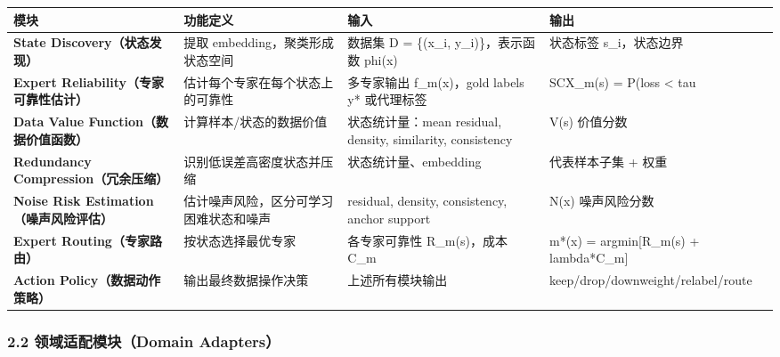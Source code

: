 \documentclass[
  12pt,
]{ctexart}
\begin{document}
\begin{longtable}[]{@{}
  >{\raggedright\arraybackslash}p{}
  >{\raggedright\arraybackslash}p{}
  >{\raggedright\arraybackslash}p{}
  >{\raggedright\arraybackslash}p{}@{}}
\toprule\noalign{}
\begin{minipage}[b]{\linewidth}\raggedright
模块
\end{minipage} & \begin{minipage}[b]{\linewidth}\raggedright
功能定义
\end{minipage} & \begin{minipage}[b]{\linewidth}\raggedright
输入
\end{minipage} & \begin{minipage}[b]{\linewidth}\raggedright
输出
\end{minipage} \\
\midrule\noalign{}
\endhead
\bottomrule\noalign{}
\endlastfoot
\textbf{State Discovery（状态发现）} & 提取 embedding，聚类形成状态空间
& 数据集 D = \{(x\_i, y\_i)\}，表示函数 phi(x) & 状态标签
s\_i，状态边界 \\
\textbf{Expert Reliability（专家可靠性估计）} &
估计每个专家在每个状态上的可靠性 & 多专家输出 f\_m(x)，gold labels y*
或代理标签 & SCX\_m(s) = P(loss \textless{} tau \\
\textbf{Data Value Function（数据价值函数）} & 计算样本/状态的数据价值 &
状态统计量：mean residual, density, similarity, consistency & V(s)
价值分数 \\
\textbf{Redundancy Compression（冗余压缩）} & 识别低误差高密度状态并压缩
& 状态统计量、embedding & 代表样本子集 + 权重 \\
\textbf{Noise Risk Estimation（噪声风险评估）} &
估计噪声风险，区分可学习困难状态和噪声 & residual, density, consistency,
anchor support & N(x) 噪声风险分数 \\
\textbf{Expert Routing（专家路由）} & 按状态选择最优专家 & 各专家可靠性
R\_m(s)，成本 C\_m & m*(x) = argmin{[}R\_m(s) + lambda*C\_m{]} \\
\textbf{Action Policy（数据动作策略）} & 输出最终数据操作决策 &
上述所有模块输出 & keep/drop/downweight/relabel/route \\
\end{longtable}

\subsubsection{2.2 领域适配模块（Domain
Adapters）}\label{ux9886ux57dfux9002ux914dux6a21ux5757domain-adapters}
\end{document}
